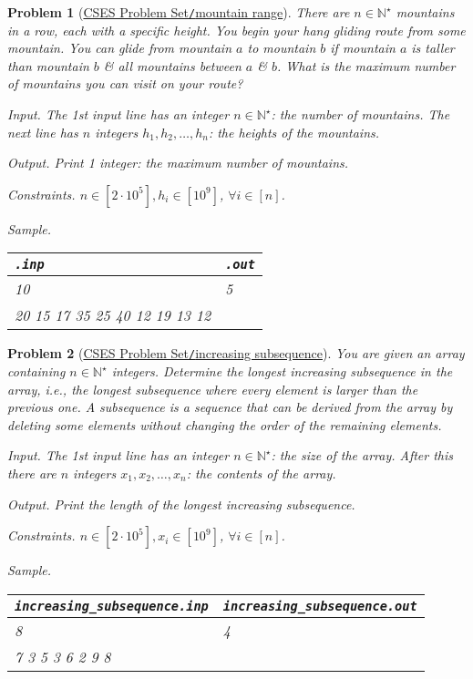 \documentclass{article}
\newtheorem{problem}{Problem}
\begin{document}
\begin{problem}[\href{https://cses.fi/problemset/task/3314}{CSES Problem Set{\tt/}mountain range}]
	There are $n\in\mathbb{N}^\star$ mountains in a row, each with a specific height. You begin your hang gliding route from some mountain. You can glide from mountain $a$ to mountain $b$ if mountain $a$ is taller than mountain $b$ \& all mountains between $a$ \& $b$. What is the maximum number of mountains you can visit on your route?
	\item {\sf Input.} The 1st input line has an integer $n\in\mathbb{N}^\star$: the number of mountains. The next line has $n$ integers $h_1,h_2,\ldots,h_n$: the heights of the mountains.
	\item {\sf Output.} Print 1 integer: the maximum number of mountains.
	\item {\sf Constraints.} $n\in[2\cdot10^5],h_i\in[10^9]$, $\forall i\in[n]$.
	\item {\sf Sample.}
	\begin{table}[H]
		\centering
		\begin{tabular}{|l|l|}
			\hline
			\verb|.inp| & \verb|.out| \\
			\hline
			10 & 5 \\
			20 15 17 35 25 40 12 19 13 12 & \\
			\hline
		\end{tabular}
	\end{table}
\end{problem}

\begin{problem}[\href{https://cses.fi/problemset/task/1145}{CSES Problem Set{\tt/}increasing subsequence}]
	You are given an array containing $n\in\mathbb{N}^\star$ integers. Determine the longest increasing subsequence in the array, i.e., the longest subsequence where every element is larger than the previous one. A subsequence is a sequence that can be derived from the array by deleting some elements without changing the order of the remaining elements.
	\item {\sf Input.} The 1st input line has an integer $n\in\mathbb{N}^\star$: the size of the array. After this there are $n$ integers $x_1,x_2,\ldots,x_n$: the contents of the array.
	\item {\sf Output.} Print the length of the longest increasing subsequence.
	\item {\sf Constraints.} $n\in[2\cdot10^5],x_i\in[10^9]$, $\forall i\in[n]$.
	\item {\sf Sample.}
	\begin{table}[H]
		\centering
		\begin{tabular}{|l|l|}
			\hline
			\verb|increasing_subsequence.inp| & \verb|increasing_subsequence.out| \\
			\hline
			8 & 4 \\
			7 3 5 3 6 2 9 8 & \\
			\hline
		\end{tabular}
	\end{table}
\end{problem}
\end{document}
